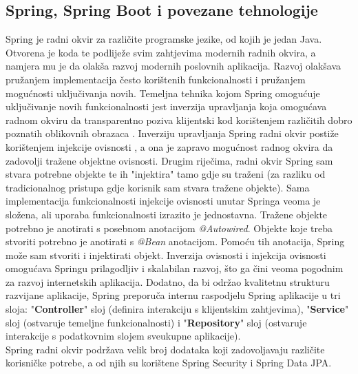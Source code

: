 \documentclass[times, utf8, zavrsni, numeric]{fer}
\begin{document}
			\subsection{Spring, Spring Boot i povezane tehnologije}
			Spring\cite{spring2021} je radni okvir za različite programske jezike, od kojih je jedan Java. Otvorena je koda te podliježe svim zahtjevima modernih radnih okvira, a namjera mu je da olakša razvoj modernih poslovnih aplikacija. Razvoj olakšava pružanjem implementacija često korištenih funkcionalnosti i pružanjem mogućnosti uključivanja novih. Temeljna tehnika kojom Spring omogućuje uključivanje novih funkcionalnosti jest inverzija upravljanja  koja omogućava radnom okviru da transparentno poziva klijentski kod korištenjem različitih dobro poznatih oblikovnih obrazaca . Inverziju upravljanja Spring radni okvir postiže korištenjem injekcije ovisnosti , a ona je zapravo mogućnost radnog okvira da zadovolji tražene objektne ovisnosti. Drugim riječima, radni okvir Spring sam stvara potrebne objekte te ih "injektira" tamo gdje su traženi (za razliku od tradicionalnog pristupa gdje korisnik sam stvara tražene objekte). Sama implementacija funkcionalnosti injekcije ovisnosti unutar Springa veoma je složena, ali uporaba funkcionalnosti izrazito je jednostavna. Tražene objekte potrebno je anotirati s posebnom anotacijom \textit{@Autowired}. Objekte koje treba stvoriti potrebno je anotirati s \textit{@Bean} anotacijom. Pomoću tih anotacija, Spring može sam stvoriti i injektirati objekt. Inverzija ovisnosti i injekcija ovisnosti omogućava Springu prilagodljiv i skalabilan razvoj, što ga čini veoma pogodnim za razvoj internetskih aplikacija. Dodatno, da bi održao kvalitetnu strukturu razvijane aplikacije, Spring preporuča internu raspodjelu Spring aplikacije u tri sloja: "\textbf{Controller}" sloj (definira interakciju s klijentskim zahtjevima), "\textbf{Service}" sloj (ostvaruje temeljne funkcionalnosti) i "\textbf{Repository}" sloj (ostvaruje interakcije s podatkovnim slojem sveukupne aplikacije).\\
			Spring radni okvir podržava velik broj dodataka koji zadovoljavaju različite korisničke potrebe, a od njih su korištene Spring Security\cite{springsecurity2021} i Spring Data JPA\cite{springdatajpa2021}.
\end{document}
